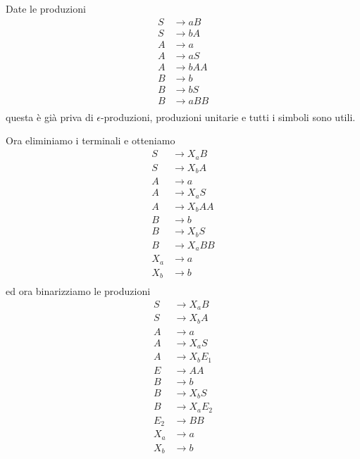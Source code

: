 \documentclass[12pt]{report}
\begin{document}
\begin{tcolorbox}[breakable]
	Date le produzioni
	\begin{align*}
		S &\rightarrow a B \\
		S &\rightarrow b A \\
		A &\rightarrow a \\
		A &\rightarrow a S \\
		A &\rightarrow b A A \\
		B &\rightarrow b \\
		B &\rightarrow b S \\
		B &\rightarrow a B B \\
	\end{align*}
	questa è già priva di $\epsilon$-produzioni, produzioni unitarie e tutti i simboli sono utili.

	Ora eliminiamo i terminali e otteniamo
	\begin{align*}
		S &\rightarrow X_a B \\
		S &\rightarrow X_b A \\
		A &\rightarrow a \\
		A &\rightarrow X_a S \\
		A &\rightarrow X_b A A \\
		B &\rightarrow b \\
		B &\rightarrow X_b S \\
		B &\rightarrow X_a B B \\
		X_a &\rightarrow a \\
		X_b &\rightarrow b \\
	\end{align*}
	ed ora binarizziamo le produzioni
	\begin{align*}
		S &\rightarrow X_a B \\
		S &\rightarrow X_b A \\
		A &\rightarrow a \\
		A &\rightarrow X_a S \\
		A &\rightarrow X_b E_1 \\
		E &\rightarrow A A \\
		B &\rightarrow b \\
		B &\rightarrow X_b S \\
		B &\rightarrow X_a E_2 \\
		E_2 &\rightarrow B B \\
		X_a &\rightarrow a \\
		X_b &\rightarrow b \\
	\end{align*}
\end{tcolorbox}

 
\end{document}
